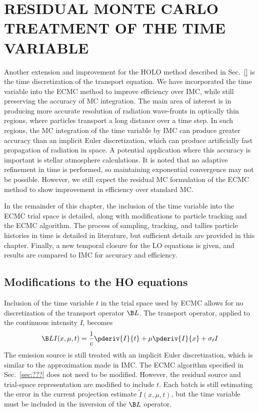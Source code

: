 
\chapter{ \uppercase {Residual Monte Carlo Treatment of the Time Variable}}
\label{sec:time}
Another extension and improvement for the HOLO method described in Sec.~\ref{} is the time discretization
of the transport equation.  We have
incorporated the time variable into the ECMC method to improve efficiency over IMC, while still preserving the
accuracy of MC integration.  The main area of interest is in producing more accurate
resolution of radiation wave-fronts in optically
thin regions, where particles transport a long distance over a time step. In such regions, the MC
integration of the time variable by IMC can produce greater accuracy than an implicit
Euler discretization, which can produce artificially fast propagation of radiation in
space.   A potential application where this accuracy is important is stellar atmosphere calculations.  It is
noted that no adaptive refinement in time is performed, so maintaining exponential convergence
may not be possible.  However, we still expect the residual MC formulation of the ECMC method
to show improvement in efficiency over standard MC.

In the remainder of this chapter, the inclusion of the time variable into the ECMC trial
space is detailed, along with modifications to particle tracking and the ECMC algorithm.
The process of sampling, tracking, and tallies particle histories in time
is detailed in literature\cite{wollaber_review,fnc,wollaber_thesis,cj_thesis}, but
sufficient details are provided in this chapter.  
Finally, a new temporal closure for the LO equations is given, and results are compared to IMC for accuracy and
efficiency.  

\section{Modifications to the HO equations}
\label{sec:time_ho}

Inclusion of the time variable $t$ in the trial space used by ECMC allows for no discretization of the
transport operator $\B L$.  The transport operator, applied to the continuous intensity
$I$, becomes
\begin{equation}
    \B LI(x,\mu,t) = \frac{1}{c}\pderiv{I}{t}  + \mu \pderiv{I}{x} + \sigma_t I
\end{equation}
The emission source is still treated with an implicit Euler discretization, which is
similar to the approximation made in IMC.  The ECMC algorithm specified in
Sec.~\ref{sec:???} does not need to be modified.  However, the residual
source and trial-space representation are modified to include $t$.   Each batch is still estimating the error in the
current projection estimate $\tilde I(x,\mu,t)$, but the time variable must be included in the inversion of the $\B L$
operator.  
